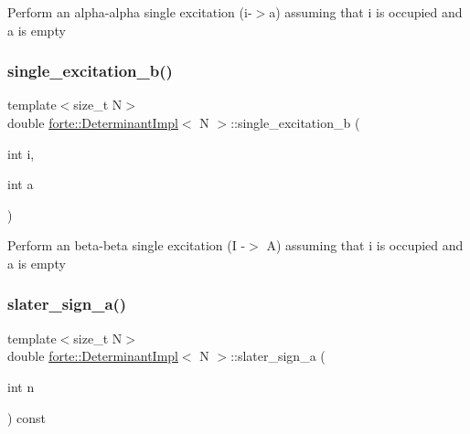 Perform an alpha-\/alpha single excitation (i-\/$>$a) assuming that i is occupied and a is empty \mbox{\label{classforte_1_1_determinant_impl_ade9281e561132e5ea22cc515b051e14b}} 
\subsubsection{\texorpdfstring{single\+\_\+excitation\+\_\+b()}{single\_excitation\_b()}}
{\footnotesize\ttfamily template$<$size\+\_\+t N$>$ \\
double \mbox{\hyperlink{classforte_1_1_determinant_impl}{forte\+::\+Determinant\+Impl}}$<$ N $>$\+::single\+\_\+excitation\+\_\+b (\begin{DoxyParamCaption}\item[{int}]{i,  }\item[{int}]{a }\end{DoxyParamCaption})\hspace{0.3cm}{\ttfamily [inline]}}

Perform an beta-\/beta single excitation (I -\/$>$ A) assuming that i is occupied and a is empty \mbox{\label{classforte_1_1_determinant_impl_ae654b55997ceb9a745edbd60a4d6978d}} 
\subsubsection{\texorpdfstring{slater\+\_\+sign\+\_\+a()}{slater\_sign\_a()}}
{\footnotesize\ttfamily template$<$size\+\_\+t N$>$ \\
double \mbox{\hyperlink{classforte_1_1_determinant_impl}{forte\+::\+Determinant\+Impl}}$<$ N $>$\+::slater\+\_\+sign\+\_\+a (\begin{DoxyParamCaption}\item[{int}]{n }\end{DoxyParamCaption}) const\hspace{0.3cm}{\ttfamily [inline]}}

